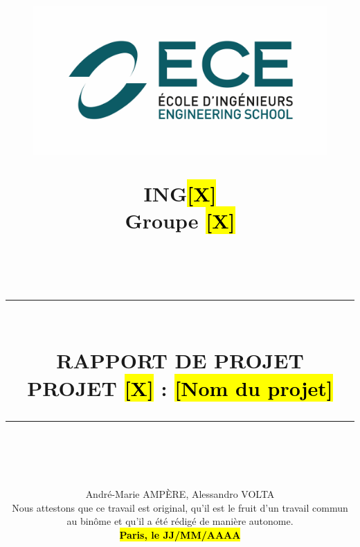 \documentclass[a4paper,11pt]{book}
\newcommand{\HRule}[1]{\rule{\linewidth}{#1}}
\begin{document}
	
	\begin{titlepage}
	\title{\vspace{-5em}
		\begin{figure}[htb]
			\begin{minipage}[t]{.45\textwidth}
				\centering
				\includegraphics[width=\textwidth]{ece.png}
			\end{minipage}
			\hfill
			\begin{minipage}[t]{.45\textwidth}
				\centering
				\flushright\vspace{-12mm}\Large{\textbf{ING\hl{[X]}}\\ Groupe \hl{[X]}}
			\end{minipage}  
		\end{figure}
		\normalsize \textsc{} \\ [1.2cm]
		\HRule{1.5pt} \\ [0.5cm]
		\LARGE \textbf{\Large{RAPPORT DE PROJET}\\ \vspace{5mm}
			\Huge{\textcolor{ece}{PROJET \hl{[X]} : \hl{[Nom du projet]}}}}
		\HRule{1.5pt} \\ 
		\normalsize  \vspace{1cm}
		}
	\date{André-Marie	AMPÈRE, Alessandro	VOLTA\\ Nous attestons que ce travail est original, qu’il est le fruit d’un travail commun au binôme et qu’il a été rédigé de manière autonome. \\ \textbf{\hl{Paris, le JJ/MM/AAAA}}}
	
	\author{}
\end{titlepage}
	
\end{document}
